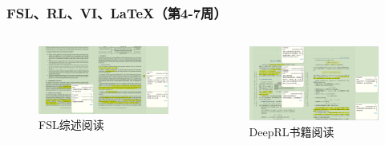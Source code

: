 \documentclass[10pt,aspectratio=43,mathserif]{beamer}
\begin{document}
        \begin{frame}
		  \frametitle{\textbf{FSL、RL、VI、\LaTeX（第4-7周）}}
            \begin{columns}[b]

                \begin{figure}
                    \centering
                    \includegraphics[width=1.1\textwidth]{figures/fsl.png}
                    \caption{FSL综述阅读}
                    \label{fig:fsl}
                \end{figure}

                \begin{figure}
                    \centering
                    \includegraphics[width=1.1\textwidth]{figures/rl.png}
                    \caption{DeepRL书籍阅读}
                    \label{fig:rl}
                \end{figure}


\end{columns}
\end{frame}
\end{document}
